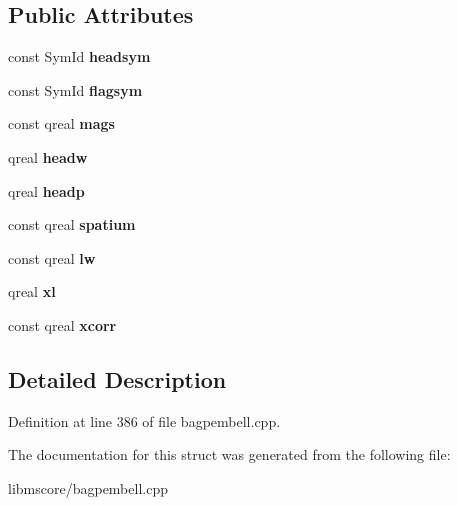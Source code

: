 \subsection*{Public Attributes}
\begin{DoxyCompactItemize}
\item 
\mbox{\label{struct_ms_1_1_b_e_drawing_data_x_afa37e6b5143372ed94115a41550c7c11}} 
const Sym\+Id {\bfseries headsym}
\item 
\mbox{\label{struct_ms_1_1_b_e_drawing_data_x_af5cb81dae675aa4de99922f7df5e9223}} 
const Sym\+Id {\bfseries flagsym}
\item 
\mbox{\label{struct_ms_1_1_b_e_drawing_data_x_a2abd7d2355cc773aa7a19dbc8b5e323b}} 
const qreal {\bfseries mags}
\item 
\mbox{\label{struct_ms_1_1_b_e_drawing_data_x_a82909146247e4b2a25a2a10dc86f3c8b}} 
qreal {\bfseries headw}
\item 
\mbox{\label{struct_ms_1_1_b_e_drawing_data_x_a710e5c9a21aea0b5fabd19d295360a8b}} 
qreal {\bfseries headp}
\item 
\mbox{\label{struct_ms_1_1_b_e_drawing_data_x_a0a90d32daac2f15555ff080fb36d5559}} 
const qreal {\bfseries spatium}
\item 
\mbox{\label{struct_ms_1_1_b_e_drawing_data_x_a63ba309cfc03d3bc2c45de08cb45625b}} 
const qreal {\bfseries lw}
\item 
\mbox{\label{struct_ms_1_1_b_e_drawing_data_x_a78720b93afd0fea7a5ea81434831cef8}} 
qreal {\bfseries xl}
\item 
\mbox{\label{struct_ms_1_1_b_e_drawing_data_x_a4faa79fbe6786ac4f009078a4105b999}} 
const qreal {\bfseries xcorr}
\end{DoxyCompactItemize}


\subsection{Detailed Description}


Definition at line 386 of file bagpembell.\+cpp.



The documentation for this struct was generated from the following file\+:\begin{DoxyCompactItemize}
\item 
libmscore/bagpembell.\+cpp\end{DoxyCompactItemize}
